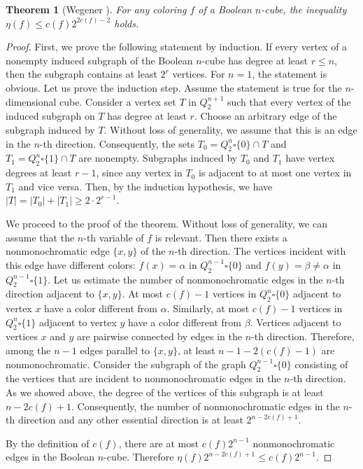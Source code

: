 \documentclass[11pt]{article}
\newtheorem{theorem}{Theorem}[section]
\theoremstyle{definition}
\begin{document}
\begin{theorem}[Wegener \cite{Wegener}]
For any coloring $f$ of a Boolean $n$-cube, the inequality
$\eta(f)\leq c(f)2^{2c(f)-2}$ holds.
\end{theorem}
\begin{proof}
First, we prove the following statement by induction. If every vertex of a nonempty induced subgraph of the Boolean $n$-cube has degree at least $r\leq n$, then the subgraph contains at least  $2^r$ vertices. 
   For $n=1$, the statement is obvious. Let us prove the induction step. Assume the statement is true for the $n$-dimensional cube. Consider a vertex set $T$ in $Q^{n+1}_2$ such that
every vertex of the induced subgraph on $T$ has  degree  at least $r$. Choose an arbitrary edge of the subgraph induced by  $T$. Without
loss of generality, we assume that this is an edge in the $n$-th direction.
Consequently, the sets $T_0=Q_2^n\square \{0\}\cap T$ and
$T_1=Q_2^n\square \{1\}\cap T$ are nonempty. Subgraphs induced by
 $T_0$ and $T_1$ have vertex degrees at least $r-1$,
since any vertex in $T_0$ is adjacent to at most one
vertex in $T_1$ and vice versa. Then, by the induction hypothesis, we have
$|T|=|T_0|+|T_1|\geq 2\cdot 2^{r-1}$.

We proceed to the proof of the theorem. Without loss of generality, we can
assume that the $n$-th variable of $f$ is relevant.
 Then there exists a nonmonochromatic  edge  $\{x,y\}$
of the $n$-th direction. The vertices incident with this edge have different colors: $f(x)=\alpha$ in 
$Q_2^{n-1}\square \{0\}$ and $f(y)=\beta\neq \alpha$ in 
$Q_2^{n-1}\square \{1\}$. Let us estimate the number of nonmonochromatic edges in the $n$-th direction adjacent to
$\{x,y\}$. At most
$c(f)-1$ vertices in $Q_2^n\square \{0\}$ adjacent to vertex $x$
have a color different from $\alpha$. Similarly,
at most $c(f)-1$ vertices in $Q_2^n\square
\{1\}$ adjacent to vertex $y$ have a color different from $\beta$. Vertices adjacent to vertices $x$ and $y$ are pairwise connected by edges in the $n$-th direction. 
Therefore, among the $n-1$ edges parallel to $\{x,y\}$, at least
 $n-1-2(c(f)-1)$
 are nonmonochromatic. Consider the subgraph of the graph
$Q_2^{n-1}\square \{0\}$ consisting of the vertices that are incident to
nonmonochromatic edges in the $n$-th direction. As we showed above, the degree
of the vertices of this subgraph is at least $n-2c(f)+1$. Consequently, the number of
 nonmonochromatic edges in the $n$-th direction and any other essential
direction is at least $2^{n-2c(f)+1}$.

By the definition of $c(f)$, there are at most
$c(f)2^{n-1}$ nonmonochromatic edges in the Boolean $n$-cube. Therefore
$\eta(f)2^{n-2c(f)+1}\leq c(f)2^{n-1}$.
\end{proof}
\end{document}
